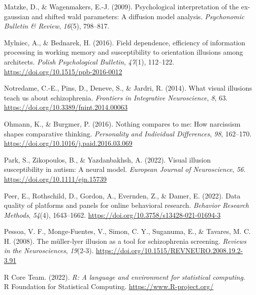 \documentclass[
  man,floatsintext]{apa6}
\newlength{\cslhangindent}
\newlength{\cslentryspacingunit} %
\newenvironment{CSLReferences}[2] %
 {%
  \setlength{\parindent}{0pt}
  \ifodd #1
  \let\oldpar\par
  \def\par{\hangindent=\cslhangindent\oldpar}
  \fi
  \setlength{\parskip}{#2\cslentryspacingunit}
 }%
 {}
\begin{document}
\begin{CSLReferences}{1}{0}
\leavevmode{}%
Matzke, D., \& Wagenmakers, E.-J. (2009). Psychological interpretation of the ex-gaussian and shifted wald parameters: A diffusion model analysis. \emph{Psychonomic Bulletin \& Review}, \emph{16}(5), 798--817.

\leavevmode{}%
Mylniec, A., \& Bednarek, H. (2016). Field dependence, efficiency of information processing in working memory and susceptibility to orientation illusions among architects. \emph{Polish Psychological Bulletin}, \emph{47}(1), 112--122. \url{https://doi.org/10.1515/ppb-2016-0012}

\leavevmode{}%
Notredame, C.-E., Pins, D., Deneve, S., \& Jardri, R. (2014). What visual illusions teach us about schizophrenia. \emph{Frontiers in Integrative Neuroscience}, \emph{8}, 63. \url{https://doi.org/10.3389/fnint.2014.00063}

\leavevmode{}%
Ohmann, K., \& Burgmer, P. (2016). Nothing compares to me: How narcissism shapes comparative thinking. \emph{Personality and Individual Differences}, \emph{98}, 162--170. \url{https://doi.org/10.1016/j.paid.2016.03.069}

\leavevmode{}%
Park, S., Zikopoulos, B., \& Yazdanbakhsh, A. (2022). Visual illusion susceptibility in autism: A neural model. \emph{European Journal of Neuroscience}, \emph{56}. \url{https://doi.org/10.1111/ejn.15739}

\leavevmode{}%
Peer, E., Rothschild, D., Gordon, A., Evernden, Z., \& Damer, E. (2022). Data quality of platforms and panels for online behavioral research. \emph{Behavior Research Methods}, \emph{54}(4), 1643--1662. \url{https://doi.org/10.3758/s13428-021-01694-3}

\leavevmode{}%
Pessoa, V. F., Monge-Fuentes, V., Simon, C. Y., Suganuma, E., \& Tavares, M. C. H. (2008). The müller-lyer illusion as a tool for schizophrenia screening. \emph{Reviews in the Neurosciences}, \emph{19}(2-3). \url{https://doi.org/10.1515/REVNEURO.2008.19.2-3.91}

\leavevmode{}%
R Core Team. (2022). \emph{R: A language and environment for statistical computing}. R Foundation for Statistical Computing. \url{https://www.R-project.org/}


\end{CSLReferences}
\end{document}
